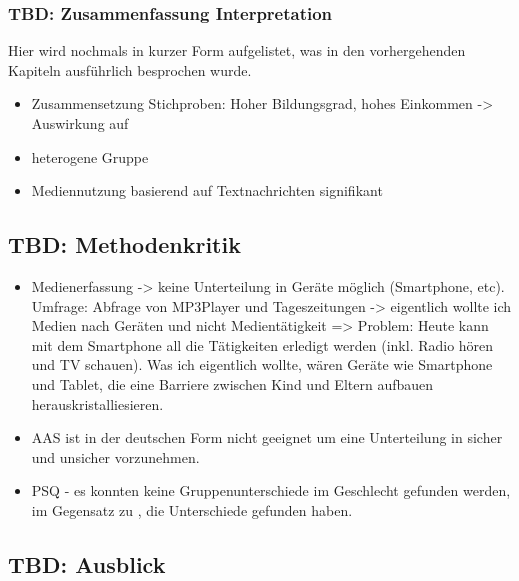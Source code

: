 \subsubsection{TBD: Zusammenfassung Interpretation}
Hier wird nochmals in kurzer Form aufgelistet, was in den vorhergehenden Kapiteln ausführlich besprochen wurde.
\begin{itemize}
    \item Zusammensetzung Stichproben: Hoher Bildungsgrad, hohes Einkommen -> Auswirkung auf 
    \item heterogene Gruppe
    \item Mediennutzung basierend auf Textnachrichten signifikant
\end{itemize}

\subsection{TBD: Methodenkritik} \label{sec:Methodenkritik}
\begin{itemize}
    \item Medienerfassung -> keine Unterteilung in Geräte möglich (Smartphone, etc). Umfrage: Abfrage von MP3Player und Tageszeitungen -> eigentlich wollte ich Medien nach Geräten und nicht Medientätigkeit => Problem: Heute kann mit dem Smartphone all die Tätigkeiten erledigt werden (inkl. Radio hören und TV schauen). Was ich eigentlich wollte, wären Geräte wie Smartphone und Tablet, die eine Barriere zwischen Kind und Eltern aufbauen herauskristalliesieren.
    \item AAS ist in der deutschen Form nicht geeignet um eine Unterteilung in sicher und unsicher vorzunehmen.
    \item PSQ - es konnten keine Gruppenunterschiede im Geschlecht gefunden werden, im Gegensatz zu , die Unterschiede gefunden haben.
\end{itemize}

\subsection{TBD: Ausblick} \label{sec:Ausblick}